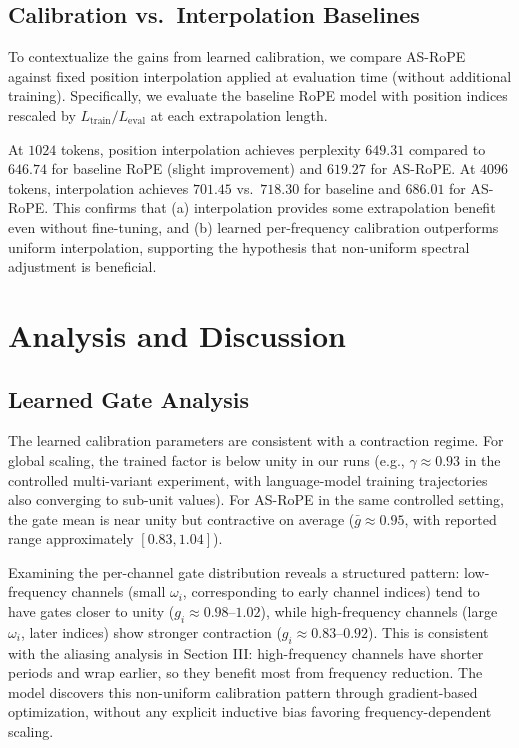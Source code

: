 \documentclass[conference]{IEEEtran}
\begin{document}
\subsection{Calibration vs.\ Interpolation Baselines}
To contextualize the gains from learned calibration, we compare AS-RoPE against fixed position interpolation applied at evaluation time (without additional training). Specifically, we evaluate the baseline RoPE model with position indices rescaled by $L_{\text{train}} / L_{\text{eval}}$ at each extrapolation length.

At $1024$ tokens, position interpolation achieves perplexity $649.31$ compared to $646.74$ for baseline RoPE (slight improvement) and $619.27$ for AS-RoPE. At $4096$ tokens, interpolation achieves $701.45$ vs.\ $718.30$ for baseline and $686.01$ for AS-RoPE. This confirms that (a) interpolation provides some extrapolation benefit even without fine-tuning, and (b) learned per-frequency calibration outperforms uniform interpolation, supporting the hypothesis that non-uniform spectral adjustment is beneficial.

\section{Analysis and Discussion}

\subsection{Learned Gate Analysis}
The learned calibration parameters are consistent with a contraction regime. For global scaling, the trained factor is below unity in our runs (e.g., $\gamma\approx0.93$ in the controlled multi-variant experiment, with language-model training trajectories also converging to sub-unit values). For AS-RoPE in the same controlled setting, the gate mean is near unity but contractive on average ($\bar g\approx0.95$, with reported range approximately $[0.83,1.04]$).

Examining the per-channel gate distribution reveals a structured pattern: low-frequency channels (small $\omega_i$, corresponding to early channel indices) tend to have gates closer to unity ($g_i \approx 0.98$--$1.02$), while high-frequency channels (large $\omega_i$, later indices) show stronger contraction ($g_i \approx 0.83$--$0.92$). This is consistent with the aliasing analysis in Section III: high-frequency channels have shorter periods and wrap earlier, so they benefit most from frequency reduction. The model discovers this non-uniform calibration pattern through gradient-based optimization, without any explicit inductive bias favoring frequency-dependent scaling.
\end{document}
